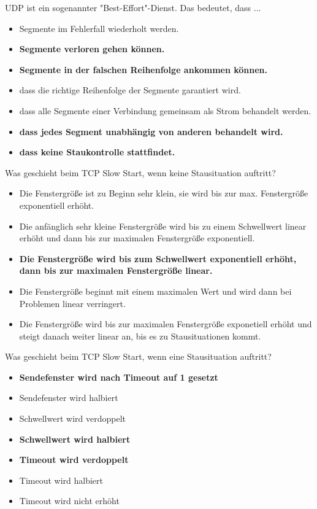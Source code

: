 \documentclass{article}
\begin{document}
	UDP ist ein sogenannter "Best-Effort"-Dienst. Das bedeutet, dass ... 
	\begin{itemize}
		\item Segmente im Fehlerfall wiederholt werden.
		\item \textbf{Segmente verloren gehen können.}
		\item \textbf{Segmente in der falschen Reihenfolge ankommen können.}
		\item dass die richtige Reihenfolge der Segmente garantiert wird.
		\item dass alle Segmente einer Verbindung gemeinsam als Strom behandelt werden.
		\item \textbf{dass jedes Segment unabhängig von anderen behandelt wird.}
		\item \textbf{dass keine Staukontrolle stattfindet.}
	\end{itemize}

	Was geschieht beim TCP Slow Start, wenn keine Stausituation auftritt? 
	\begin{itemize}
		\item Die Fenstergröße ist zu Beginn sehr klein, sie wird bis zur max. Fenstergröße exponentiell erhöht. 
		\item Die anfänglich sehr kleine Fenstergröße wird bis zu einem Schwellwert linear erhöht und dann bis zur maximalen Fenstergröße exponentiell.
		\item \textbf{Die Fenstergröße wird bis zum Schwellwert exponentiell erhöht, dann bis zur maximalen Fenstergröße linear. }
		\item Die Fenstergröße beginnt mit einem maximalen Wert und wird dann bei Problemen linear verringert. 
		\item Die Fenstergröße wird bis zur maximalen Fenstergröße exponetiell erhöht und steigt danach weiter linear an, bis es zu Stausituationen kommt. 
	\end{itemize}

	 Was geschieht beim TCP Slow Start, wenn eine Stausituation auftritt?
	 \begin{itemize}
	 	\item \textbf{Sendefenster wird nach Timeout auf 1 gesetzt}
	 	\item Sendefenster wird halbiert
	 	\item Schwellwert wird verdoppelt
	 	\item \textbf{Schwellwert wird halbiert}
	 	\item \textbf{Timeout wird verdoppelt}
	 	\item Timeout wird halbiert
	 	\item Timeout wird nicht erhöht
	 \end{itemize}
 
\end{document}

